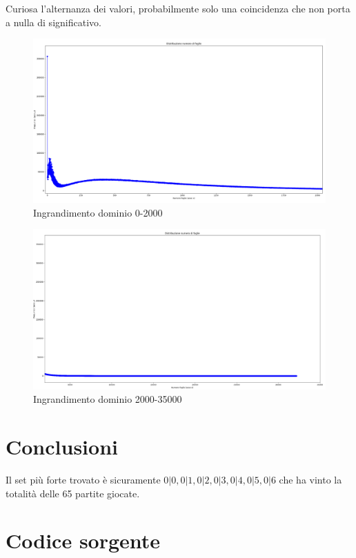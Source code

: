 \documentclass[a4paper,12pt]{report} %
\begin{document}
Curiosa l'alternanza dei valori, probabilmente solo una coincidenza che non porta a nulla di significativo.

\begin{figure}[h!]
    \centering
    \includegraphics[width=1\textwidth]{imgs/grafico_0_2000.png} %
    \caption{Ingrandimento dominio 0-2000}
    \label{fig:etichetta}
\end{figure}

\begin{figure}[h!]
    \centering
    \includegraphics[width=1\textwidth]{imgs/grafico_2000_35000.png} %
    \caption{Ingrandimento dominio 2000-35000}
    \label{fig:etichetta}
\end{figure}




\chapter{Conclusioni}

Il set più forte trovato è sicuramente \(0|0, 0|1, 0|2, 0|3, 0|4, 0|5, 0|6\) che ha vinto la totalità delle 65 partite giocate.



\appendix
\chapter{Codice sorgente}

\end{document}
